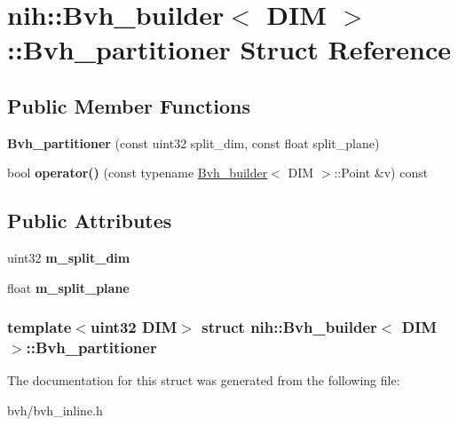 \hypertarget{structnih_1_1_bvh__builder_1_1_bvh__partitioner}{
\section{nih\-:\-:\-Bvh\-\_\-builder$<$ \-D\-I\-M $>$\-:\-:\-Bvh\-\_\-partitioner \-Struct \-Reference}
\label{structnih_1_1_bvh__builder_1_1_bvh__partitioner}
}
\subsection*{\-Public \-Member \-Functions}
\begin{DoxyCompactItemize}
\item 
\hypertarget{structnih_1_1_bvh__builder_1_1_bvh__partitioner_a8befe8bd5e728ef4e66d879cf4a5aa44}{
{\bfseries \-Bvh\-\_\-partitioner} (const uint32 split\-\_\-dim, const float split\-\_\-plane)}
\label{structnih_1_1_bvh__builder_1_1_bvh__partitioner_a8befe8bd5e728ef4e66d879cf4a5aa44}

\item 
\hypertarget{structnih_1_1_bvh__builder_1_1_bvh__partitioner_a558a324a0cba121314c02d6ba12c7ad1}{
bool {\bfseries operator()} (const typename \hyperlink{classnih_1_1_bvh__builder}{\-Bvh\-\_\-builder}$<$ \-D\-I\-M $>$\-::\-Point \&v) const }
\label{structnih_1_1_bvh__builder_1_1_bvh__partitioner_a558a324a0cba121314c02d6ba12c7ad1}

\end{DoxyCompactItemize}
\subsection*{\-Public \-Attributes}
\begin{DoxyCompactItemize}
\item 
\hypertarget{structnih_1_1_bvh__builder_1_1_bvh__partitioner_adc4cebd879749042633c0b7be90fabfa}{
uint32 {\bfseries m\-\_\-split\-\_\-dim}}
\label{structnih_1_1_bvh__builder_1_1_bvh__partitioner_adc4cebd879749042633c0b7be90fabfa}

\item 
\hypertarget{structnih_1_1_bvh__builder_1_1_bvh__partitioner_ad8270c2fbcfbb1f5bea3341d98d11140}{
float {\bfseries m\-\_\-split\-\_\-plane}}
\label{structnih_1_1_bvh__builder_1_1_bvh__partitioner_ad8270c2fbcfbb1f5bea3341d98d11140}

\end{DoxyCompactItemize}
\subsubsection*{template$<$uint32 \-D\-I\-M$>$ struct nih\-::\-Bvh\-\_\-builder$<$ D\-I\-M $>$\-::\-Bvh\-\_\-partitioner}



\-The documentation for this struct was generated from the following file\-:\begin{DoxyCompactItemize}
\item 
bvh/bvh\-\_\-inline.\-h\end{DoxyCompactItemize}
